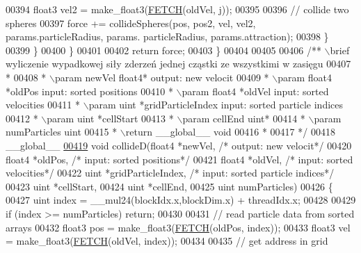 \begin{DoxyCode}
00394                 float3 vel2 = make\_float3(\hyperlink{particles__kernel_8cuh_a12269d678a65f18889c2a7e98c756457}{FETCH}(oldVel, j));
00395 
00396                 \textcolor{comment}{// collide two spheres}
00397                 force += collideSpheres(pos, pos2, vel, vel2, params.particleRadius, params.
      particleRadius, params.attraction);
00398             \}
00399         \}
00400     \}
00401 
00402     \textcolor{keywordflow}{return} force;
00403 \}
00404 
00405 
00406 \textcolor{comment}{/** \(\backslash\)brief wyliczenie wypadkowej siły zderzeń jednej cząstki ze wszystkimi w zasięgu}
00407 \textcolor{comment}{ *}
00408 \textcolor{comment}{ * \(\backslash\)param newVel float4* output: new velocit}
00409 \textcolor{comment}{ * \(\backslash\)param float4 *oldPos input: sorted positions}
00410 \textcolor{comment}{ * \(\backslash\)param float4 *oldVel input: sorted velocities}
00411 \textcolor{comment}{ * \(\backslash\)param uint   *gridParticleIndex input: sorted particle indices}
00412 \textcolor{comment}{ * \(\backslash\)param uint   *cellStart}
00413 \textcolor{comment}{ * \(\backslash\)param cellEnd uint*}
00414 \textcolor{comment}{ * \(\backslash\)param numParticles uint}
00415 \textcolor{comment}{ * \(\backslash\)return \_\_global\_\_ void}
00416 \textcolor{comment}{ *}
00417 \textcolor{comment}{ */}
00418 \_\_global\_\_
\hypertarget{particles__kernel__impl_8cuh_source_l00419}{}\hyperlink{particles__kernel__impl_8cuh_a9056c5c0f33cbc0acb1c2b12e1a2a530}{00419} \textcolor{keywordtype}{void} collideD(float4 *newVel,               \textcolor{comment}{/* output: new velocit*/}
00420               float4 *oldPos,               \textcolor{comment}{/* input: sorted positions*/}
00421               float4 *oldVel,               \textcolor{comment}{/* input: sorted velocities*/}
00422               uint   *gridParticleIndex,    \textcolor{comment}{/* input: sorted particle indices*/}
00423               uint   *cellStart,
00424               uint   *cellEnd,
00425               uint    numParticles)
00426 \{
00427     uint index = \_\_mul24(blockIdx.x,blockDim.x) + threadIdx.x;
00428 
00429     \textcolor{keywordflow}{if} (index >= numParticles) \textcolor{keywordflow}{return};
00430 
00431     \textcolor{comment}{// read particle data from sorted arrays}
00432     float3 pos = make\_float3(\hyperlink{particles__kernel_8cuh_a12269d678a65f18889c2a7e98c756457}{FETCH}(oldPos, index));
00433     float3 vel = make\_float3(\hyperlink{particles__kernel_8cuh_a12269d678a65f18889c2a7e98c756457}{FETCH}(oldVel, index));
00434 
00435     \textcolor{comment}{// get address in grid}

\end{DoxyCode}
